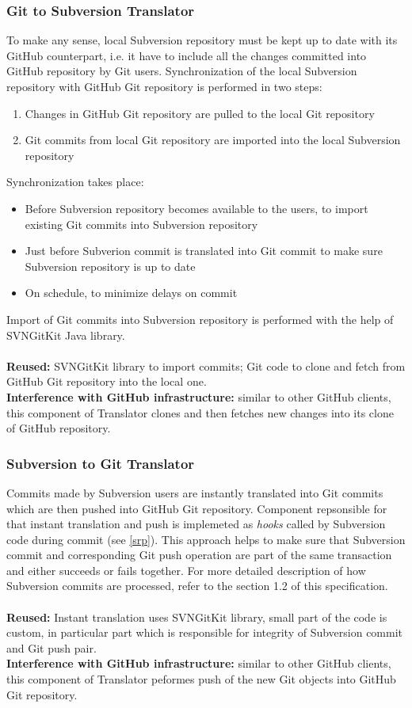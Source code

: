 \subsubsection{Git to Subversion Translator}
To make any sense, local Subversion repository must be kept up to date with its GitHub counterpart, i.e. it have to include all the changes committed into GitHub repository by Git users. Synchronization of the local Subversion repository with GitHub Git repository is performed in two steps:
\begin{enumerate}
\item Changes in GitHub Git repository are pulled to the local Git repository
\item Git commits from local Git repository are imported into the local Subversion repository
\end{enumerate} 
Synchronization takes place:
\begin{itemize}
\item Before Subversion repository becomes available to the users, to import existing Git commits into Subversion repository
\item Just before Subverion commit is translated into Git commit to make sure Subversion repository is up to date
\item On schedule, to minimize delays on commit
\end{itemize} 
Import of Git commits into Subversion repository is performed with the help of SVNGitKit Java library.
\\\\
\textbf{Reused:} SVNGitKit library to import commits; Git code to clone and fetch from GitHub Git repository into the local one.\\
\textbf{Interference with GitHub infrastructure:} similar to other GitHub clients, this component of Translator clones and then fetches new changes into its clone of GitHub repository.

\subsubsection{Subversion to Git Translator}
Commits made by Subversion users are instantly translated into Git commits which are then pushed into GitHub Git repository. Component repsonsible 
for that instant translation and push is implemeted as \emph{hooks} called by Subversion code during commit (see \ref{srp}).
\newpage 
This approach helps to make sure that Subversion commit and corresponding Git push operation are part of the same transaction and either succeeds or fails together.
For more detailed description of how Subversion commits are processed, refer to the section 1.2 of this specification.
\\\\
\textbf{Reused:} Instant translation uses SVNGitKit library, small part of the code is custom, in particular part which is responsible for integrity of Subversion commit and Git push pair.\\
\textbf{Interference with GitHub infrastructure:} similar to other GitHub clients, this component of Translator peformes push of the new Git objects into GitHub Git repository.

